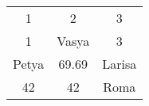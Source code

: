 \begin{tabular}{ c  c  c }1 & 2 & 3 \\1 & Vasya & 3 \\Petya & 69.69 & Larisa \\42 & 42 & Roma \\\end{tabular}